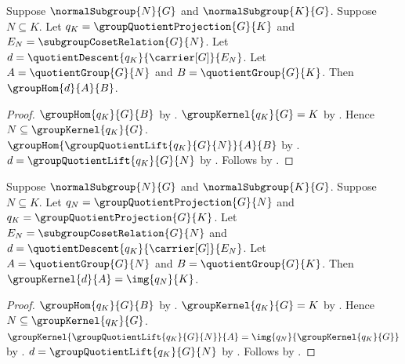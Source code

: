 \begin{theorem}\label{group_quotient_comparison_hom}
    Suppose $\normalSubgroup{N}{G}$ and $\normalSubgroup{K}{G}$.
    Suppose $N\subseteq K$.
    Let $q_K=\groupQuotientProjection{G}{K}$ and
        $E_N=\subgroupCosetRelation{G}{N}$.
    Let $d=\quotientDescent{q_K}{\carrier[G]}{E_N}$.
    Let $A=\quotientGroup{G}{N}$ and $B=\quotientGroup{G}{K}$.
    Then $\groupHom{d}{A}{B}$.
\end{theorem}
\begin{proof}
    $\groupHom{q_K}{G}{B}$ by
        .
    $\groupKernel{q_K}{G}=K$ by
        .
    Hence $N\subseteq\groupKernel{q_K}{G}$.
    $\groupHom{\groupQuotientLift{q_K}{G}{N}}{A}{B}$ by
        .
    $d=\groupQuotientLift{q_K}{G}{N}$ by
        .
    Follows by \auto.
\end{proof}

\begin{theorem}\label{group_quotient_comparison_kernel}
    Suppose $\normalSubgroup{N}{G}$ and $\normalSubgroup{K}{G}$.
    Suppose $N\subseteq K$.
    Let $q_N=\groupQuotientProjection{G}{N}$ and
        $q_K=\groupQuotientProjection{G}{K}$.
    Let $E_N=\subgroupCosetRelation{G}{N}$ and
        $d=\quotientDescent{q_K}{\carrier[G]}{E_N}$.
    Let $A=\quotientGroup{G}{N}$ and $B=\quotientGroup{G}{K}$.
    Then $\groupKernel{d}{A}=\img{q_N}{K}$.
\end{theorem}
\begin{proof}
    $\groupHom{q_K}{G}{B}$ by
        .
    $\groupKernel{q_K}{G}=K$ by
        .
    Hence $N\subseteq\groupKernel{q_K}{G}$.
    $\groupKernel{\groupQuotientLift{q_K}{G}{N}}{A}=
        \img{q_N}{\groupKernel{q_K}{G}}$ by
        .
    $d=\groupQuotientLift{q_K}{G}{N}$ by
        .
    Follows by \auto.
\end{proof}

